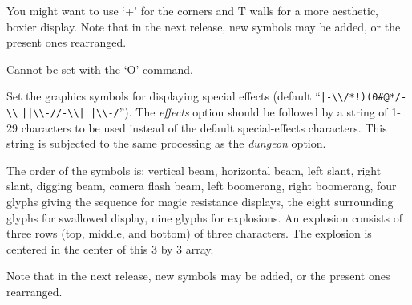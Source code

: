 You might want to use `+' for the corners and T walls for a more
aesthetic, boxier display.  Note that in the next release, new symbols
may be added, or the present ones rearranged.

Cannot be set with the `O' command.
\item[\tb{effects}]
Set the graphics symbols for displaying special effects
(default ``\verb&|-\\/*!)(0#@*/-\\& \verb&||\\-//-\\| |\\-/&'').
The
{\it effects }
option should be followed by a string of 1-29
characters to be used instead of the default special-effects characters.
This string is subjected to the same processing as the
{\it dungeon }
option.

The order of the symbols is:  vertical beam, horizontal beam, left slant,
right slant, digging beam, camera flash beam, left boomerang, right boomerang,
four glyphs giving the sequence for magic resistance displays,
the eight surrounding glyphs for swallowed display,
nine glyphs for explosions.
An explosion consists of three rows (top, middle, and bottom) of three
characters.  The explosion is centered in the center of this 3 by 3
array.

Note that in the next release, new symbols may be added,
or the present ones rearranged.

